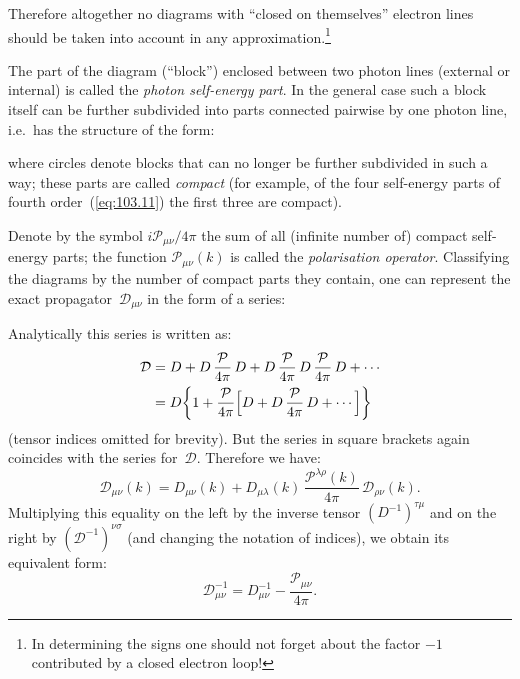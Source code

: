Therefore altogether no diagrams with ``closed on themselves'' electron lines should be taken into account in any approximation.\footnote{In determining the signs one should not forget about the factor $-1$ contributed by a closed electron loop!}


The part of the diagram (``block'') enclosed between two photon lines (external or internal) is called the \emph{photon self-energy part}. In the general case such a block itself can be further subdivided into parts connected pairwise by one photon line, i.e.\ has the structure of the form:


\noindent where circles denote blocks that can no longer be further subdivided in such a way; these parts are called \emph{compact} (for example, of the four self-energy parts of fourth order~(\ref{eq:103.11}) the first three are compact).

Denote by the symbol $i\mathcal{P}_{\mu\nu}/4\pi$ the sum of all (infinite number of) compact self-energy parts; the function $\mathcal{P}_{\mu\nu}(k)$ is called the \emph{polarisation operator}. Classifying the diagrams by the number of compact parts they contain, one can represent the exact propagator~$\mathcal{D}_{\mu\nu}$ in the form of a series:


\noindent Analytically this series is written as:
\begin{equation}
\begin{split}
\mathcal{D} &= D + D\,\frac{\mathcal{P}}{4\pi}\,D + D\,\frac{\mathcal{P}}{4\pi}\,D\,\frac{\mathcal{P}}{4\pi}\,D + \cdots \\
&= D\biggl\{1 + \frac{\mathcal{P}}{4\pi}\Bigl[D + D\,\frac{\mathcal{P}}{4\pi}\,D + \cdots\Bigr]\biggr\}
\end{split}
\label{eq:103.12}
\end{equation}
(tensor indices omitted for brevity). But the series in square brackets again coincides with the series for~$\mathcal{D}$. Therefore we have:
\begin{equation}
\mathcal{D}_{\mu\nu}(k) = D_{\mu\nu}(k) + D_{\mu\lambda}(k)\,\frac{\mathcal{P}^{\lambda\rho}(k)}{4\pi}\,\mathcal{D}_{\rho\nu}(k).
\label{eq:103.13}
\end{equation}
Multiplying this equality on the left by the inverse tensor $(D^{-1})^{\tau\mu}$ and on the right by $(\mathcal{D}^{-1})^{\nu\sigma}$ (and changing the notation of indices), we obtain its equivalent form:
\begin{equation}
\mathcal{D}^{-1}_{\mu\nu} = D^{-1}_{\mu\nu} - \frac{\mathcal{P}_{\mu\nu}}{4\pi}.
\label{eq:103.14}
\end{equation}

